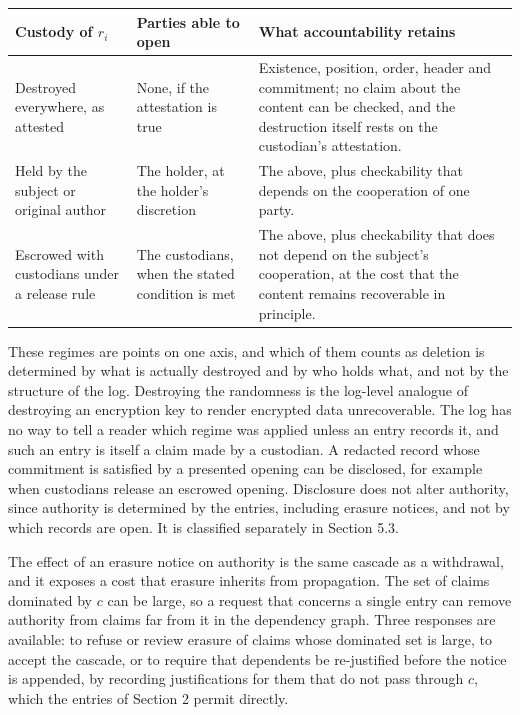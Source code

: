 \documentclass[11pt]{article}
\theoremstyle{plain}
\theoremstyle{definition}
\theoremstyle{remark}
\begin{document}
\begin{center}
\small
\begin{tabular}{|p{}|p{}|p{}|}
\hline
Custody of $r_i$ & Parties able to open & What accountability retains \\
\hline
Destroyed everywhere, as attested & None, if the attestation is true & Existence, position, order, header and commitment; no claim about the content can be checked, and the destruction itself rests on the custodian's attestation. \\
\hline
Held by the subject or original author & The holder, at the holder's discretion & The above, plus checkability that depends on the cooperation of one party. \\
\hline
Escrowed with custodians under a release rule & The custodians, when the stated condition is met & The above, plus checkability that does not depend on the subject's cooperation, at the cost that the content remains recoverable in principle. \\
\hline
\end{tabular}
\end{center}

These regimes are points on one axis, and which of them counts as deletion is determined by what is actually destroyed and by who holds what, and not by the structure of the log. Destroying the randomness is the log-level analogue of destroying an encryption key to render encrypted data unrecoverable. The log has no way to tell a reader which regime was applied unless an entry records it, and such an entry is itself a claim made by a custodian. A redacted record whose commitment is satisfied by a presented opening can be disclosed, for example when custodians release an escrowed opening. Disclosure does not alter authority, since authority is determined by the entries, including erasure notices, and not by which records are open. It is classified separately in Section 5.3.

The effect of an erasure notice on authority is the same cascade as a withdrawal, and it exposes a cost that erasure inherits from propagation. The set of claims dominated by $c$ can be large, so a request that concerns a single entry can remove authority from claims far from it in the dependency graph. Three responses are available: to refuse or review erasure of claims whose dominated set is large, to accept the cascade, or to require that dependents be re-justified before the notice is appended, by recording justifications for them that do not pass through $c$, which the entries of Section 2 permit directly.
\end{document}
